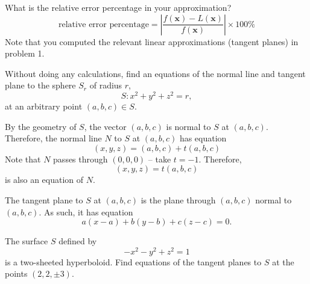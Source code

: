 \documentclass[answers]{exam}
\begin{document}
\begin{questions}
    What is the relative error percentage in your approximation?
    \[
        \text{relative error percentage} = \left|\frac{f(\mathbf{x})-L(\mathbf{x})}{f(\mathbf{x})}\right|\times 100\%
    \]
    Note that you computed the relevant linear approximations (tangent planes) in problem 1.

    \question
    Without doing any calculations, find an equations of the normal line and tangent plane
    to the sphere $S_r$ of radius $r$,
    \[
        S:x^2+y^2+z^2=r,
    \]
    at an arbitrary point $(a,b,c)\in S$.

    \begin{solution}
        By the geometry of $S$, the vector $(a,b,c)$ is normal to $S$ at $(a,b,c)$.
        Therefore, the normal line $N$ to $S$ at $(a,b,c)$ has equation
        \[
            (x,y,z) = (a,b,c) + t(a,b,c)
        \]
        Note that $N$ passes through $(0,0,0)$ -- take $t=-1$. Therefore,
        \[
            (x,y,z) = t(a,b,c)
        \]
        is also an equation of $N$.

        The tangent plane to $S$ at $(a,b,c)$ is the plane through $(a,b,c)$ normal to $(a,b,c)$. As such, it has equation
        \[
            a(x-a) + b(y-b) + c(z-c) = 0.
        \]
    \end{solution}

    \question The surface $S$ defined by
    \[
        -x^2 - y^2 + z^2 = 1
    \]
    is a two-sheeted hyperboloid.
    Find equations of the tangent planes to $S$
    at the points $(2,2,\pm 3)$.


\end{questions}
\end{document}
